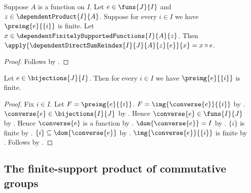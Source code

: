 \begin{proposition}\label{spike_dependent_direct_sum_reindex_apply}
    Suppose $A$ is a function on $I$.
    Let $e\in\funs{J}{I}$ and $z\in\dependentProduct{I}{A}$.
    Suppose for every $i\in I$ we have
        $\preimg{e}{\{i\}}$ is finite.
    Let
        $x\in\dependentFinitelySupportedFunctions{I}{A}{z}$.
    Then
        $\apply{\dependentDirectSumReindex{I}{J}{A}{z}{e}}{x}
            =x\circ e$.
\end{proposition}
\begin{proof}
    Follows by
        .
\end{proof}

\begin{lemma}\label{spike_bijection_has_finite_fibers}
    Let $e\in\bijections{J}{I}$.
    Then for every $i\in I$ we have
        $\preimg{e}{\{i\}}$ is finite.
\end{lemma}
\begin{proof}
    Fix $i\in I$.
    Let $F=\preimg{e}{\{i\}}$.
    $F=\img{\converse{e}}{\{i\}}$ by
        .
    $\converse{e}\in\bijections{I}{J}$ by
        .
    Hence $\converse{e}\in\funs{I}{J}$ by
        .
    Hence $\converse{e}$ is a function by
        .
    $\dom{\converse{e}}=I$ by .
    $\{i\}$ is finite by .
    $\{i\}\subseteq\dom{\converse{e}}$ by
        .
    $\img{\converse{e}}{\{i\}}$ is finite by
        .
    Follows by \auto.
\end{proof}

\subsection{The finite-support product of commutative groups}

